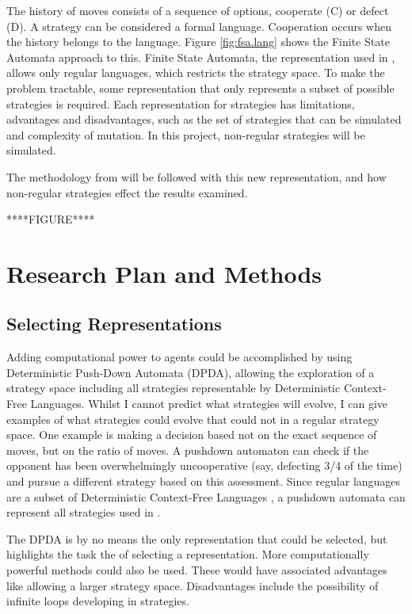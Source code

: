 \documentclass[a4paper,11pt,bcshonoursthesis,singlespace,twoside]{cssethesis}
\begin{document}
The history of moves consists of a sequence of options, cooperate (C) or defect (D). 
A strategy can be considered a formal language. 
Cooperation occurs when the history belongs to the language. 
Figure \ref{fig:fsa.lang} shows the Finite State Automata approach to this. 
Finite State Automata, the representation used in \citet{van-veelen:PNAS:2012}, allows only regular languages, which restricts the strategy space. 
To make the problem tractable, some representation that only represents a subset of possible strategies is required. 
Each representation for strategies has limitations, advantages and disadvantages, such as the set of strategies that can be simulated and complexity of mutation. 
In this project, non-regular strategies will be simulated.

The methodology from \citet{van-veelen:PNAS:2012} will be followed with this new representation, and how non-regular strategies effect the results examined.

****FIGURE****
\section{Research Plan and Methods}
\subsection{Selecting Representations}
Adding computational power to agents could be accomplished by using Deterministic Push-Down Automata (DPDA), allowing the exploration of a strategy space including all strategies representable by Deterministic Context-Free Languages. 
Whilst I cannot predict what strategies will evolve, I can give examples of what strategies could evolve that could not in a regular strategy space. 
One example is making a decision based not on the exact sequence of moves, but on the ratio of moves. 
A pushdown automaton can check if the opponent has been overwhelmingly uncooperative (say, defecting 3/4 of the time) and pursue a different strategy based on this assessment. 
Since regular languages are a subset of Deterministic Context-Free Languages \citep{Sipser2006}, a pushdown automata can represent all strategies used in \citet{van-veelen:PNAS:2012}. 

The DPDA is by no means the only representation that could be selected, but highlights the task the of selecting a representation. 
More computationally powerful methods could also be used. 
These would have associated advantages like allowing a larger strategy space. 
Disadvantages include the possibility of infinite loops developing in strategies.
\end{document}
